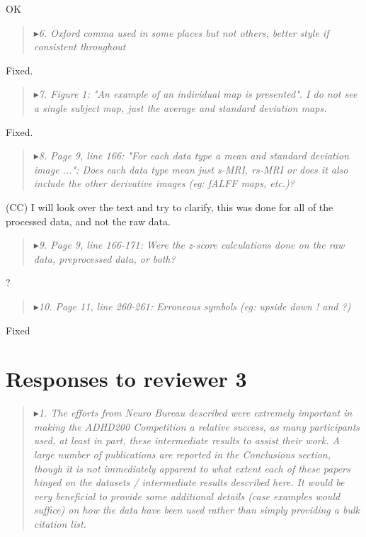 \documentclass[authoryear,3p]{elsarticle}
\begin{document}
OK

\begin{quote}
$\blacktriangleright$\emph{6. Oxford comma used in some places but not others, better style if consistent throughout}
\end{quote}

Fixed.

\begin{quote}
$\blacktriangleright$\emph{7. Figure 1: "An example of an individual map is presented". I do not see a single subject map, just the average and standard deviation maps.}
\end{quote}

Fixed. 

\begin{quote}
$\blacktriangleright$\emph{8.  Page 9, line 166: "For each data type a mean and standard deviation image ...": Does each data type mean just {s-MRI, rs-MRI} or does it also include the other derivative images (eg: fALFF maps, etc.)?}
\end{quote}

(CC) I will look over the text and try to clarify, this was done for all of the processed data, and not the raw data.

\begin{quote}
$\blacktriangleright$\emph{9. Page 9, line 166-171: Were the z-score calculations done on the raw data, preprocessed data, or both?}
\end{quote}

?

\begin{quote}
$\blacktriangleright$\emph{10. Page 11, line 260-261: Erroneous symbols (eg: upside down ! and ?)}
\end{quote}

Fixed

\section{Responses to reviewer 3}

\begin{quote}
$\blacktriangleright$\emph{1. The efforts from Neuro Bureau described were extremely important in making the ADHD200 Competition a relative success, as many participants used, at least in part, these intermediate results to assist their work. A large number of publications are reported in the Conclusions section, though it is not immediately apparent to what extent each of these papers hinged on the datasets / intermediate results described here.  It would be very beneficial to provide some additional details (case examples would suffice) on how the data have been used rather than simply providing a bulk citation list. 
}
\end{quote}
\end{document}
